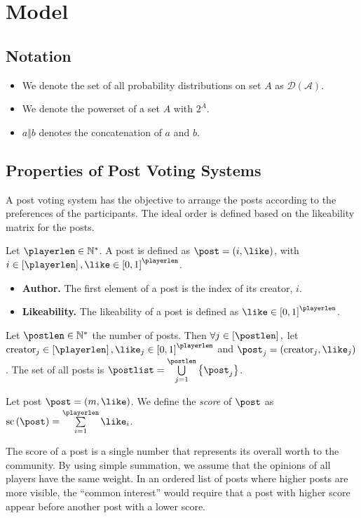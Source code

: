 \section{Model}
  \subsection{Notation}
    \begin{itemize}
      \item We denote the set of all probability distributions on set $A$ as
      $\mathcal{D\left(A\right)}$.
      \item We denote the powerset of a set $A$ with $2^A$.
      \item $a \Vert b$ denotes the concatenation of $a$ and $b$.
    \end{itemize}

  \subsection{Properties of Post Voting Systems}
    A post voting system has the objective to arrange the posts according to the
    preferences of the participants. The ideal order is defined based on the
    likeability matrix for the posts.

    \begin{definition}[Post]
      Let $\playerlen \in \mathbb{N}^*$. A post is defined as $\post = \left(i,
      \like\right)$, with $i \in \left[\playerlen\right], \like \in \left[0,
      1\right]^\playerlen$.
      \begin{itemize}
        \item \textbf{Author.} The first element of a post is the index of its
        creator, $i$.

        \item \textbf{Likeability.} The likeability of a post is defined as
        $\like \in \left[0, 1\right]^\playerlen$.
      \end{itemize}
      Let $\postlen \in \mathbb{N}^*$ the number of posts. Then $\forall j \in
      \left[\postlen\right],$ let $\mathrm{creator}_j \in
      \left[\playerlen\right], \like_j \in \left[0, 1\right]^\playerlen$ and
      $\post_j = \left(\mathrm{creator}_j, \like_j\right)$. The set of all posts
      is $\postlist = \bigcup\limits_{j=1}^\postlen \left\{\post_j\right\}$.
    \end{definition}

    \begin{definition}
      Let post $\post = \left(m, \like\right)$. We define the \emph{score} of
      $\post$ as $\mathrm{sc}\left(\post\right) = \sum\limits_{i = 1}^\playerlen
      \like_i$.
    \end{definition}
    The score of a post is a single number that represents its overall worth to
    the community. By using simple summation, we assume that the opinions of all
    players have the same weight. In an ordered list of posts where higher posts
    are more visible, the ``common interest'' would require that a post with
    higher score appear before another post with a lower score.

